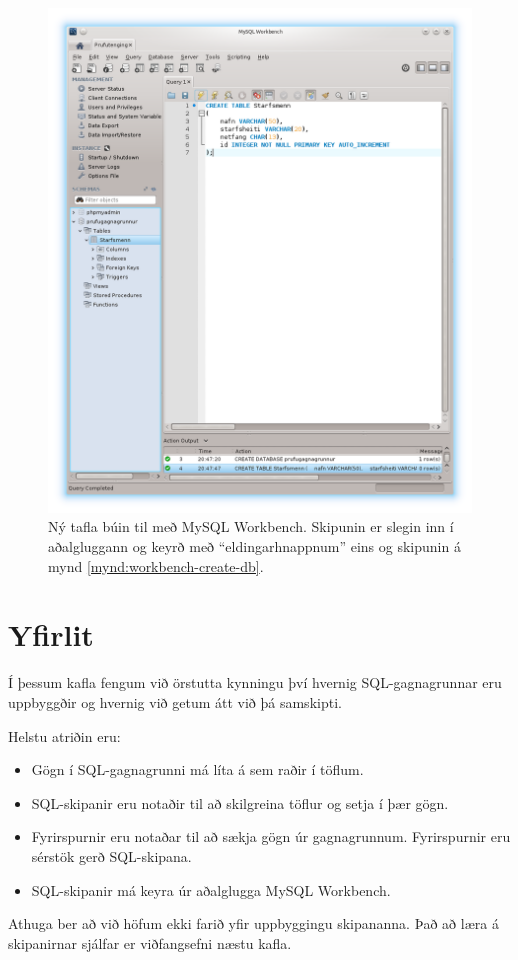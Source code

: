 \begin{figure}
\caption[Ný tafla]{Ný tafla búin til með MySQL Workbench. Skipunin er slegin inn í aðalgluggann og keyrð með ``eldingarhnappnum'' eins og skipunin á mynd \ref{mynd:workbench-create-db}.}
\label{mynd:workbench-create-table}
\centering
\includegraphics[width=0.8\linewidth]{myndir/workbench-create-table}
\end{figure}

\section{Yfirlit}
Í þessum kafla fengum við örstutta kynningu því hvernig SQL-gagnagrunnar eru uppbyggðir og hvernig við getum átt við þá samskipti. 

Helstu atriðin eru:
\begin{itemize}
 \item Gögn í SQL-gagnagrunni má líta á sem raðir í töflum.
 \item SQL-skipanir eru notaðir til að skilgreina töflur og setja í þær gögn.
 \item Fyrirspurnir eru notaðar til að sækja gögn úr gagnagrunnum. Fyrirspurnir eru sérstök gerð SQL-skipana.
 \item SQL-skipanir má keyra úr aðalglugga MySQL Workbench.
\end{itemize}
Athuga ber að við höfum ekki farið yfir uppbyggingu skipananna. Það að læra á skipanirnar sjálfar er viðfangsefni næstu kafla.